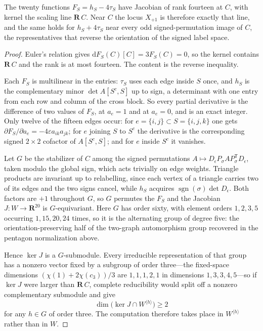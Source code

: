 \begin{theorem}
\label{thm:conference-equality-rigidity}
The twenty functions \(F_S=h_S-4\tau_S\) have Jacobian of rank fourteen at
\(C\), with kernel the scaling line \(\mathbf R\,C\).  Near \(C\) the locus
\(X_{+1}\) is therefore exactly that line, and the same holds for
\(h_S+4\tau_S\) near every odd signed-permutation image of \(C\), the
representatives that reverse the orientation of the signed label space.
\end{theorem}

\begin{proof}
Euler's relation gives \(\mathrm dF_S(C)[C]=3F_S(C)=0\), so the kernel contains
\(\mathbf R\,C\) and the rank is at most fourteen.  The content is the reverse
inequality.

Each \(F_S\) is multilinear in the entries: \(\tau_S\) uses each edge inside
\(S\) once, and \(h_S\) is the complementary minor \(\det A[S^c,S]\) up to sign,
a determinant with one entry from each row and column of the cross block.  So
every partial derivative is the difference of two values of \(F_S\), at
\(a_e=1\) and at \(a_e=0\), and is an exact integer.  Only twelve of the fifteen
edges occur: for \(e=\{i,j\}\subset S=\{i,j,k\}\) one gets
\(\partial F_S/\partial a_e=-4\varepsilon a_{ik}a_{jk}\); for \(e\) joining
\(S\) to \(S^c\) the derivative is the corresponding signed \(2\times2\) cofactor
of \(A[S^c,S]\); and for \(e\) inside \(S^c\) it vanishes.

Let \(G\) be the stabilizer of \(C\) among the signed permutations
\(A\mapsto D_\epsilon P_\sigma AP_\sigma^{\mathsf T}D_\epsilon\), taken modulo
the global sign, which acts trivially on edge weights.  Triangle products are
invariant up to relabelling, since each vertex of a triangle carries two of its
edges and the two signs cancel, while \(h_S\) acquires
\(\operatorname{sgn}(\sigma)\det D_\epsilon\).  Both factors are \(+1\)
throughout \(G\), so \(G\) permutes the \(F_S\) and the Jacobian
\(J\colon W\to\mathbf R^{20}\) is \(G\)-equivariant.  Here \(G\) has order sixty,
with element orders \(1,2,3,5\) occurring \(1,15,20,24\) times, so it is the
alternating group of degree five: the orientation-preserving half of the
two-graph automorphism group recovered in the pentagon normalization above.

Hence \(\ker J\) is a \(G\)-submodule.  Every irreducible representation of that
group has a nonzero vector fixed by a subgroup of order three---the fixed-space
dimensions \((\chi(1)+2\chi(c_3))/3\) are \(1,1,1,2,1\) in dimensions
\(1,3,3,4,5\)---so if \(\ker J\) were larger than \(\mathbf R\,C\), complete
reducibility would split off a nonzero complementary submodule and give
\[
 \dim\bigl(\ker J\cap W^{\langle h\rangle}\bigr)\ge2
\]
for any \(h\in G\) of order three.  The computation therefore takes place in
\(W^{\langle h\rangle}\) rather than in \(W\).


\end{proof}
